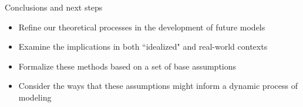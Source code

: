 \documentclass[10pt]{beamer} %
\theoremstyle{plain} %
\theoremstyle{definition} %
\begin{document}




\begin{frame}{Conclusions and next steps}

\begin{itemize}
\item Refine our theoretical processes in the development of future models
\item Examine the implications in both ``idealized" and real-world contexts
\item Formalize these methods based on a set of base assumptions
\item Consider the ways that these assumptions might inform a dynamic process of modeling

\end{itemize}

\end{frame}
\end{document}
